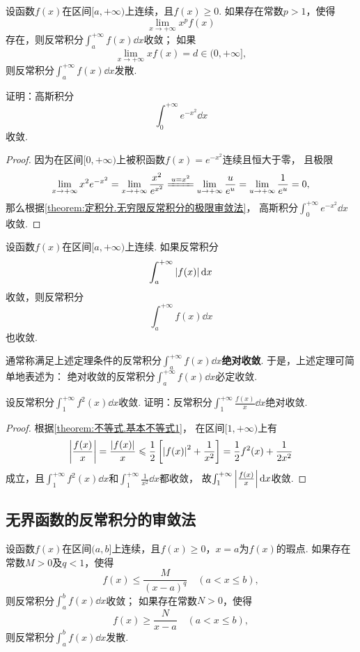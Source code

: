 \begin{theorem}[极限审敛法]\label{theorem:定积分.无穷限反常积分的极限审敛法}
设函数\(f(x)\)在区间\([a,+\infty)\)上连续，且\(f(x) \geqslant 0\).
如果存在常数\(p > 1\)，使得\[
\lim\limits_{x \to +\infty} x^p f(x)
\]存在，则反常积分\(\int_a^{+\infty} f(x) \dd{x}\)收敛；
如果\[
\lim\limits_{x \to +\infty} x f(x) = d \in (0,+\infty],
\]则反常积分\(\int_a^{+\infty} f(x) \dd{x}\)发散.
\end{theorem}

\begin{example}\label{example:定积分.高斯积分的收敛性}
证明：高斯积分\[
\int_0^{+\infty} e^{-x^2} \dd{x}
\]收敛.
\begin{proof}
因为在区间\([0,+\infty)\)上被积函数\(f(x) = e^{-x^2}\)连续且恒大于零，%
且极限\[
\lim\limits_{x\to+\infty} x^2 e^{-x^2}
= \lim\limits_{x\to+\infty} \frac{x^2}{e^{x^2}}
\xlongequal{u=x^2} \lim\limits_{u\to+\infty} \frac{u}{e^u}
= \lim\limits_{u\to+\infty} \frac{1}{e^u}
= 0,
\]
那么根据\cref{theorem:定积分.无穷限反常积分的极限审敛法}，%
高斯积分\(\int_0^{+\infty} e^{-x^2} \dd{x}\)收敛.
\end{proof}
\end{example}

\begin{theorem}\label{theorem:定积分.绝对收敛的无穷限反常积分必收敛}
设函数\(f(x)\)在区间\([a,+\infty)\)上连续.
如果反常积分\[
\int_a^{+\infty} \abs{f(x)} \dd{x}
\]收敛，则反常积分\[
\int_a^{+\infty} f(x) \dd{x}
\]也收敛.
\end{theorem}
通常称满足上述定理条件的反常积分\(\int_a^{+\infty} f(x) \dd{x}\)\textbf{绝对收敛}.
于是，上述定理可简单地表述为：
绝对收敛的反常积分\(\int_a^{+\infty} f(x) \dd{x}\)必定收敛.

\begin{example}
设反常积分\(\int_1^{+\infty} f^2(x) \dd{x}\)收敛.
证明：反常积分\(\int_1^{+\infty} \frac{f(x)}{x} \dd{x}\)绝对收敛.
\begin{proof}
根据\cref{theorem:不等式.基本不等式1}，%
在区间\([1,+\infty)\)上有\[
\abs{\frac{f(x)}{x}}
= \frac{\abs{f(x)}}{x}
\leqslant \frac{1}{2} \left[
	\abs{f(x)}^2 + \frac{1}{x^2}
\right]
= \frac{1}{2} f^2(x) + \frac{1}{2x^2}
\]成立，且\(\int_1^{+\infty} f^2(x) \dd{x}\)和\(\int_1^{+\infty} \frac{1}{x^2} \dd{x}\)都收敛，%
故\(\int_1^{+\infty} \abs{\frac{f(x)}{x}} \dd{x}\)收敛.
\end{proof}
\end{example}

\subsection{无界函数的反常积分的审敛法}
\begin{theorem}[比较审敛法]\label{theorem:定积分.无界函数的反常积分的比较审敛法}
设函数\(f(x)\)在区间\((a,b]\)上连续，且\(f(x) \geqslant 0\)，\(x=a\)为\(f(x)\)的瑕点.
如果存在常数\(M > 0\)及\(q < 1\)，使得\[
f(x) \leqslant \frac{M}{(x-a)^q} \quad (a < x \leqslant b),
\]则反常积分\(\int_a^b f(x) \dd{x}\)收敛；
如果存在常数\(N > 0\)，使得\[
f(x) \geqslant \frac{N}{x - a} \quad (a < x \leqslant b),
\]则反常积分\(\int_a^b f(x) \dd{x}\)发散.
\end{theorem}

